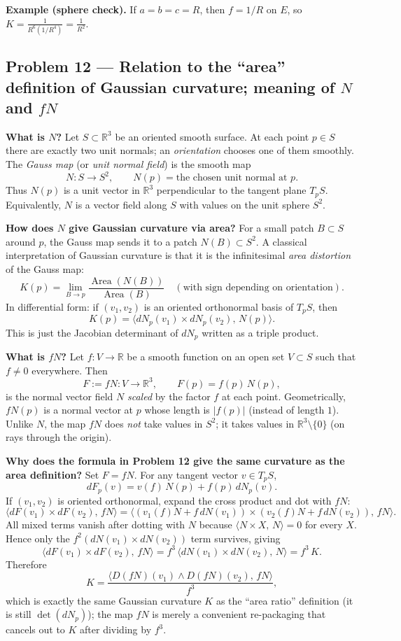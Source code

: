 \documentclass[12pt,a4paper]{article}
\theoremstyle{plain}
\theoremstyle{definition}      %
\begin{document}
	\medskip
	\textbf{Example (sphere check).}
	If $a=b=c=R$, then $f=1/R$ on $E$, so $K=\frac{1}{R^6(1/R^4)}=\frac1{R^2}$.
	
	
	\subsection*{Problem 12 — Relation to the ``area'' definition of Gaussian curvature; meaning of $N$ and $fN$}
	
	\textbf{What is $N$?}
	Let $S\subset\mathbb R^3$ be an oriented smooth surface.
	At each point $p\in S$ there are exactly two unit normals; an \emph{orientation} chooses one of them smoothly.
	The \emph{Gauss map} (or \emph{unit normal field}) is the smooth map
	\[
	N:S\to S^2,\qquad N(p)=\text{the chosen unit normal at }p.
	\]
	Thus $N(p)$ is a unit vector in $\mathbb R^3$ perpendicular to the tangent plane $T_pS$.
	Equivalently, $N$ is a vector field along $S$ with values on the unit sphere $S^2$.
	
	\medskip
	\textbf{How does $N$ give Gaussian curvature via area?}
	For a small patch $B\subset S$ around $p$, the Gauss map sends it to a patch $N(B)\subset S^2$.
	A classical interpretation of Gaussian curvature is that it is the infinitesimal \emph{area distortion} of the Gauss map:
	\[
	K(p)=\lim_{B\to p}\frac{\operatorname{Area}(N(B))}{\operatorname{Area}(B)}
	\quad
	(\text{with sign depending on orientation}).
	\]
	In differential form: if $(v_1,v_2)$ is an oriented orthonormal basis of $T_pS$, then
	\[
	K(p)=\big\langle dN_p(v_1)\times dN_p(v_2),\,N(p)\big\rangle.
	\]
	This is just the Jacobian determinant of $dN_p$ written as a triple product.
	
	\medskip
	\textbf{What is $fN$?}
	Let $f:V\to\mathbb R$ be a smooth function on an open set $V\subset S$ such that $f\neq 0$ everywhere.
	Then
	\[
	F:=fN:V\to\mathbb R^3,\qquad F(p)=f(p)\,N(p),
	\]
	is the normal vector field $N$ \emph{scaled} by the factor $f$ at each point.
	Geometrically, $fN(p)$ is a normal vector at $p$ whose length is $|f(p)|$ (instead of length $1$).
	Unlike $N$, the map $fN$ does \emph{not} take values in $S^2$; it takes values in $\mathbb R^3\setminus\{0\}$
	(on rays through the origin).
	
	\medskip
	\textbf{Why does the formula in Problem 12 give the same curvature as the area definition?}
	Set $F=fN$. For any tangent vector $v\in T_pS$,
	\[
	dF_p(v)=v(f)\,N(p)+f(p)\,dN_p(v).
	\]
	If $(v_1,v_2)$ is oriented orthonormal, expand the cross product and dot with $fN$:
	\[
	\big\langle dF(v_1)\times dF(v_2),\,fN\big\rangle
	=
	\big\langle (v_1(f)N+f\,dN(v_1))\times (v_2(f)N+f\,dN(v_2)),\,fN\big\rangle.
	\]
	All mixed terms vanish after dotting with $N$ because
	$\langle N\times X,\,N\rangle=0$ for every $X$.
	Hence only the $f^2(dN(v_1)\times dN(v_2))$ term survives, giving
	\[
	\big\langle dF(v_1)\times dF(v_2),\,fN\big\rangle
	= f^3\,\big\langle dN(v_1)\times dN(v_2),\,N\big\rangle
	= f^3\,K.
	\]
	Therefore
	\[
	K=\frac{\big\langle D(fN)(v_1)\wedge D(fN)(v_2),\,fN\big\rangle}{f^3},
	\]
	which is exactly the same Gaussian curvature $K$ as the ``area ratio'' definition (it is still $\det(dN_p)$);
	the map $fN$ is merely a convenient re-packaging that cancels out to $K$ after dividing by $f^3$.
	
\end{document}
